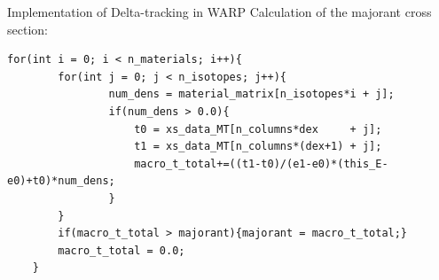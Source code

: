 \documentclass[xcolor=x11names, compress]{beamer}
\renewcommand{\(}{\begin{columns}}
\renewcommand{\)}{\end{columns}}
\newcommand{\<}[1]{\begin{column}{#1}}
\renewcommand{\>}{\end{column}}
\begin{document}
%
%
%
%
%

\begin{frame}[fragile]{Implementation of Delta-tracking in WARP}
	Calculation of the majorant cross section:
	\vspace{5 mm}
	\pause
	\begin{Verbatim}[fontsize=\footnotesize]
	for(int i = 0; i < n_materials; i++){
	    for(int j = 0; j < n_isotopes; j++){
	            num_dens = material_matrix[n_isotopes*i + j];
	            if(num_dens > 0.0){
	                t0 = xs_data_MT[n_columns*dex     + j];
	                t1 = xs_data_MT[n_columns*(dex+1) + j];
	                macro_t_total+=((t1-t0)/(e1-e0)*(this_E-e0)+t0)*num_dens;
	            }
	    }
	    if(macro_t_total > majorant){majorant = macro_t_total;}
	    macro_t_total = 0.0;
	}
	\end{Verbatim}
\end{frame}
\end{document}
